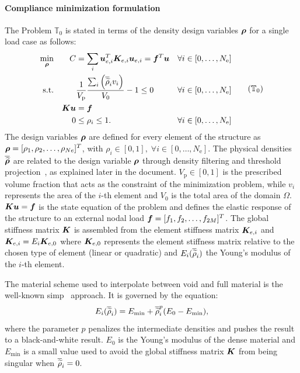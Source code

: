 \paragraph{Compliance minimization formulation} The Problem $\mathbb{T}_0$ is stated in terms of the density design variables $\bm{\rho}$ for a single load case as follows:
\begin{equation}
    \begin{aligned}
    \min_{\vect{\rho}}         && C &= \sum_{i} \vect{u}_{e,i}^T \matr{K}_{e,i} \vect{u}_{e,i}=\vect{f}^T\vect{u}&& \forall i \in [0,\dots,N_\text{e}]                         \\
    \textrm{s.t.}   && & \frac{1}{V_\text{p}}\frac{\sum_{i} \left(\rhophys_i v_i \right)}{V_0} - 1 \leq 0 && \forall i \in [0,\dots,N_\text{e}] \\
    && \matr{K}\vect{u} &= \vect{f} &&\\
    && 0 &\leq \rho_i \leq 1. && \forall i \in [0,\dots,N_\text{e}] \\
    \end{aligned}
    \tag{$\mathbb{T}_0$}
    \label{eq:02_prob-comp}
\end{equation}
The design variables $\bm{\rho}$ are defined for every element of the structure as $\bm{\rho} = [\rho_1, \rho_2, \ldots,\rho_{Ne}]^T$, with $\rho_i \in [0,1], \; \forall i \in [0,\dots,N_\text{e}]$. The physical densities $\bm{\overline{\widetilde{\rho}}}$ are related to the design variable $\bm{\rho}$ through density filtering and threshold projection~, as explained later in the document. $V_\text{p}\in [0,1]$ is the prescribed volume fraction that acts as the constraint of the minimization problem, while $v_i$ represents the area of the $i$-th element and $V_0$ is the total area of the domain $\Omega$. $\bm{K}\bm{u} = \bm{f}$ is the state equation of the problem and defines the elastic response of the structure to an external nodal load $\bm{f}=[f_1, f_2, \ldots,f_{2M}]^T$. The global stiffness matrix $\bm{K}$ is assembled from the element stiffness matrix $\bm{K}_{e,i}$ and $\bm{K}_{e,i} = E_i \bm{K}_{e,0}$ where $\bm{K}_{e,0}$ represents the element stiffness matrix relative to the chosen type of element (linear or quadratic) and $E_i(\overline{\widetilde{\rho}}_i)$ the Young's modulus of the $i$-th element. 

The material scheme used to interpolate between void and full material is the well-known \gls{simp}~ approach. It is governed by the equation:
\begin{equation}
    E_i(\overline{\widetilde{\rho}}_i) = E_{\textrm{min}} + \overline{\widetilde{\rho}}_i^p(E_0-E_{\textrm{min}}),
    \label{eq:02_simp}
\end{equation}
where the parameter $p$ penalizes the intermediate densities and pushes the result to a black-and-white result. $E_0$ is the Young's modulus of the dense material and $E_{\textrm{min}}$ is a small value used to avoid the global stiffness matrix $\bm{K}$ from being singular when $\overline{\widetilde{\rho}}_i=0$. 

